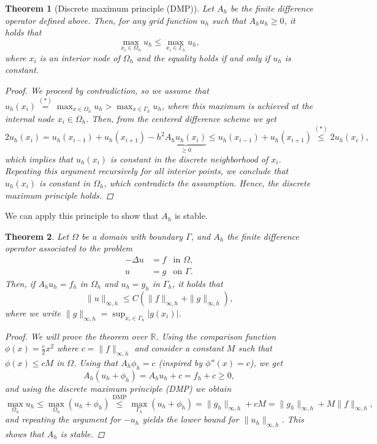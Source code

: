 \documentclass{article}
\newcommand{\R}{\mathbb{R}}
\newcommand{\tin}{\text{in }}
\newcommand{\ton}{\text{on }}
\newtheorem{theorem}{Theorem}
\begin{document}
\begin{theorem}[Discrete maximum principle (DMP)]
    Let $A_h$ be the finite difference operator defined above. Then, for any grid function $u_h$ such that $A_h u_h \geq 0$, it holds that
    $$ \max_{x_i\in \Omega_h} u_h \leq \max_{x_i\in \Gamma_h} u_h, $$
    where $x_i$ is an interior node of $\Omega_h$ and the equality holds if and only if $u_h$ is constant.
    \begin{proof}
        We proceed by contradiction, so we assume that $u_h(x_i) \overset{(*)}{=} \max_{x\in \Omega_h} u_h > \max_{x\in \Gamma_h} u_h$, where this maximum is achieved at the internal node $x_i\in \Omega_h$. Then, from the centered difference scheme we get
        $$2u_h(x_i) = u_h(x_{i-1}) + u_h(x_{i+1}) - h^2 \underbrace{A_h u_h(x_i)}_{\geq 0} \leq u_h(x_{i-1}) + u_h(x_{i+1}) \overset{(*)}{\leq} 2u_h(x_i),$$
        which implies that $u_h(x_i)$ is constant in the discrete neighborhood of $x_i$. Repeating this argument recursively for all interior points, we conclude that $u_h(x_i)$ is constant in $\Omega_h$, which contradicts the assumption. Hence, the discrete maximum principle holds.
    \end{proof}
\end{theorem}
We can apply this principle to show that $A_h$ is stable. 
\begin{theorem}
    Let $\Omega$ be a domain with boundary $\Gamma$, and $A_h$ the finite difference operator associated to the problem
    $$\begin{aligned}
        -\Delta u &= f & \tin \Omega, \\
        u &= g & \ton \Gamma.
    \end{aligned}
    $$
    Then, if $A_h u_h = f_h$ in $\Omega_h$ and $u_h = g_h$ in $\Gamma_h$, it holds that
    $$\|u\|_{\infty,h} \leq C\left(\|f\|_{\infty, h} + \|g\|_{\infty, h}\right),$$
    where we write $\|g\|_{\infty, h} = \sup_{x_i\in\Gamma_h}|g(x_i)|$. 
    \begin{proof}
        We will prove the theorem over $\R$. Using the comparison function $\phi(x) = \frac{c}{2}x^2$ where $c=\|f\|_{\infty, h}$ and consider a constant $M$ such that $\phi(x) \leq cM$ in $\Omega$. Using that $A_h \phi_h = c$ (inspired by $\phi''(x) = c$), we get
        $$A_h(u_h + \phi_h) = A_h u_h + c = f_h + c \geq 0,$$
        and using the discrete maximum principle (DMP) we obtain
        $$\max_{\Omega_h} u_h \leq \max_{\Omega_h} (u_h + \phi_h) \overset{\text{DMP}}{\leq} \max_{\Gamma_h} (u_h + \phi_h) = \|g_h\|_{\infty, h} + cM = \|g_h\|_{\infty, h} + M \|f\|_{\infty, h},$$
        and repeating the argument for $-u_h$ yields the lower bound for $\|u_h\|_{\infty,h}$. This shows that $A_h$ is stable.
    \end{proof}
\end{theorem}
\end{document}

